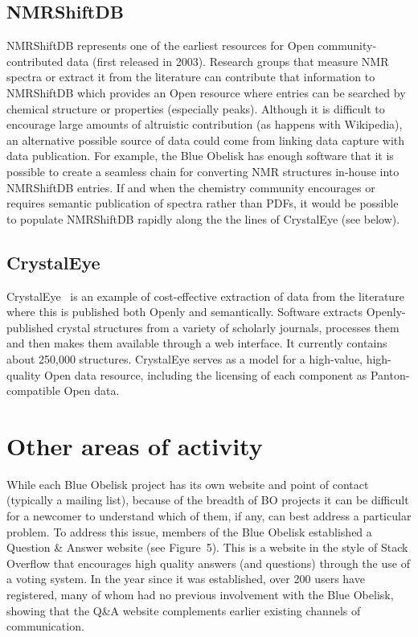\documentclass[10pt]{bmc_article}
\newenvironment{bmcformat}{\fussy\setboolean{publ}{true}}{\fussy}
\begin{document}
\begin{bmcformat}
\subsection*{NMRShiftDB}

NMRShiftDB \cite{nmrshiftdb, Steinbeck2004} represents one of the earliest resources for Open
community-contributed data (first released in 2003). Research groups that 
measure NMR spectra or extract it from the literature can contribute that
information to
NMRShiftDB which provides an Open resource where
entries can be searched by chemical structure or properties
(especially peaks). Although it is difficult to
encourage large amounts of altruistic contribution (as happens with
Wikipedia), an alternative possible source of data could come from
linking
data capture with data publication. For example, the Blue Obelisk has
enough software that it is possible to create
a seamless chain for converting NMR structures in-house into
NMRShiftDB entries. If and when the chemistry community
encourages or requires semantic publication of spectra rather than
PDFs, it would be possible to populate NMRShiftDB rapidly
along the the lines of CrystalEye (see below).

\subsection*{CrystalEye}

CrystalEye~\cite{WebCrystalEye} is an example of cost-effective extraction of data from the
literature where this is published both
Openly and semantically. Software extracts Openly-published crystal
structures from a variety of scholarly journals, processes
them and then makes them available through a web interface.
It currently contains about 250,000 structures. CrystalEye serves as a model
for a high-value, high-quality Open data
resource, including the licensing of each component as
Panton-compatible Open data.

\section*{Other areas of activity}

While each Blue Obelisk project has its own website and point of
contact (typically a mailing list), because of the breadth of BO
projects it can be difficult for a newcomer to understand which of
them, if any, can best address a particular problem. To address this
issue, members of the Blue Obelisk established a Question \& Answer
website\cite{WebBOShapado} (see Figure~5).  This is a website in the
style of Stack Overflow\cite{WebStackOverflow} that encourages high quality answers (and
questions) through the use of a voting system. In the year since it
was established, over 200 users have registered, many of whom had no
previous involvement with the Blue Obelisk, showing that the Q\&A
website complements earlier existing channels of communication.


\end{bmcformat}
\end{document}
